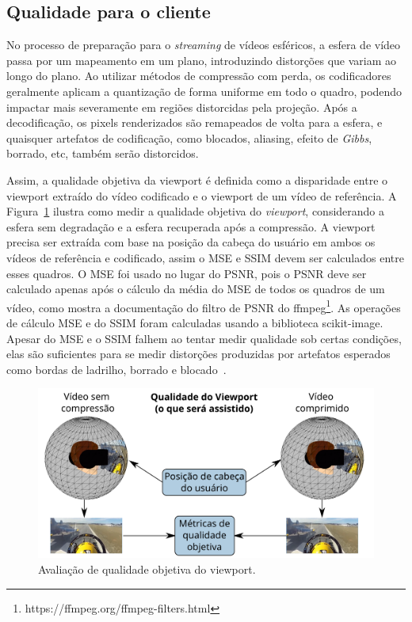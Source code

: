 \subsection{Qualidade para o cliente}

No processo de preparação para o \textit{streaming} de vídeos esféricos, a esfera de vídeo passa por um mapeamento em um plano, introduzindo distorções que variam ao longo do plano. Ao utilizar métodos de compressão com perda, os codificadores geralmente aplicam a quantização de forma uniforme em todo o quadro, podendo impactar mais severamente em regiões distorcidas pela projeção. Após a decodificação, os pixels renderizados são remapeados de volta para a esfera, e quaisquer artefatos de codificação, como blocados, aliasing, efeito de \textit{Gibbs}, borrado, etc, também serão distorcidos.

Assim, a qualidade objetiva da viewport é definida como a disparidade entre o viewport extraído do vídeo codificado e o viewport de um vídeo de referência.   A Figura~\ref{fig:QualityWorkflow} ilustra como medir a qualidade objetiva do \textit{viewport}, considerando a esfera sem degradação e a esfera recuperada após a compressão. A viewport precisa ser extraída com base na posição da cabeça do usuário em ambos os vídeos de referência e codificado, assim o MSE e SSIM devem ser calculados entre esses quadros. O MSE foi usado no lugar do PSNR, pois o PSNR deve ser calculado apenas após o cálculo da média do MSE de todos os quadros de um vídeo, como mostra a documentação do filtro de PSNR do ffmpeg\footnote{https://ffmpeg.org/ffmpeg-filters.html}. As operações de cálculo MSE e do SSIM foram calculadas usando a biblioteca scikit-image. Apesar do MSE e o SSIM falhem ao tentar medir qualidade sob certas condições, elas são suficientes para se medir distorções produzidas por artefatos esperados como bordas de ladrilho, borrado e blocado~\cite{Bovik2009}.

\begin{figure}[h]
        \centering
        \includegraphics[width=0.8\linewidth]{fig/Project_Quality_Workflow_2.png}
        \caption{Avaliação de qualidade objetiva do viewport.}
        \label{fig:QualityWorkflow}
\end{figure}



